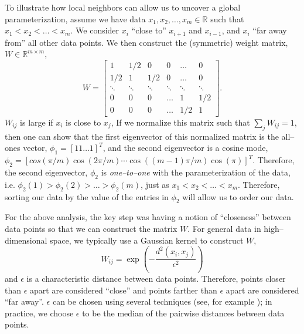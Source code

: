 \documentclass[11pt]{article}
\begin{document}
To illustrate how local neighbors can allow us to uncover a global parameterization, assume we have data $x_1, x_2, \dots, x_m \in \mathbb{R}$ such that $x_1 < x_2 < \dots < x_m$.
%
We consider $x_i$ ``close to'' $x_{i+1}$ and $x_{i-1}$, and $x_i$ ``far away from'' all other data points. 
%
We then construct the (symmetric) weight matrix, $W \in \mathbb{R}^{m \times m}$,
\begin{equation}
W = 
\begin{bmatrix}
	1 & 1/2 & 0 & 0 & \dots & 0 \\
	1/2 & 1 & 1/2 & 0 & \dots & 0 \\
	\ddots & \ddots & \ddots & \ddots & \ddots & \ddots \\
	0 & 0 & 0 & \dots & 1 & 1/2 \\
	0 & 0 & 0 & \dots & 1/2 & 1 
\end{bmatrix}.
\end{equation}
%
$W_{ij}$ is large if $x_i$ is close to $x_j$,
%
If we normalize this matrix such that $\sum_j W_{ij} = 1$, then one can show that the first eigenvector of this normalized matrix is the all--ones vector, $\phi_1 = [1 1 \dots 1]^T$, and the second eigenvector is a cosine mode, $\phi_2 = [cos(\pi/m) \cos(2 \pi/ m) \cdots \cos((m-1) \pi / m) \cos(\pi)]^T$.
%
Therefore, the second eigenvector, $\phi_2$ is {\em one--to--one} with the parameterization of the data, i.e. $\phi_2(1) > \phi_2(2) > \dots > \phi_2(m)$, just as $x_1 < x_2 < \dots < x_m$. 
%
Therefore, sorting our data by the value of the entries in $\phi_2$ will allow us to order our data.

For the above analysis, the key step was having a notion of ``closeness'' between data points so that we can construct the matrix $W$.
%
For general data in high--dimensional space, we typically use a Gaussian kernel to construct $W$,
\begin{equation} \label{eq:dmaps_W}
W_{ij} = \exp \left( -\frac{d^2(x_i, x_j)}{\epsilon^2} \right)
\end{equation}
and $\epsilon$ is a characteristic distance between data points.
%
Therefore, points closer than $\epsilon$ apart are considered ``close'' and points farther than $\epsilon$ apart are considered ``far away''.
%
$\epsilon$ can be chosen using several techniques (see, for example \cite{coifman2008graph}); in practice, we choose $\epsilon$ to be the median of the pairwise distances between data points.
\end{document}
